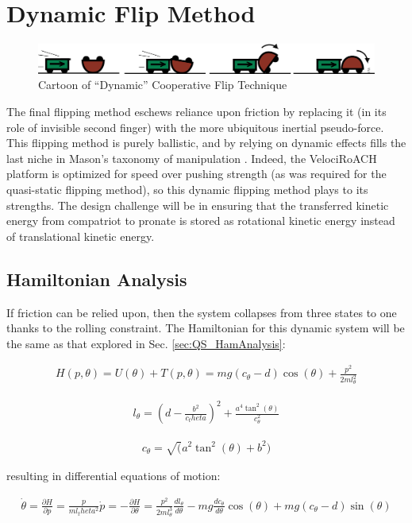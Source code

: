 \documentclass[letterpaper]{report}
\begin{document}
\chapter{Dynamic Flip Method}
\begin{figure}[ht]
\centering
\includegraphics[width=1.0\textwidth]{Dynamic_CoopCartoon.png}
\caption{Cartoon of ``Dynamic'' Cooperative Flip Technique \label{fig:DynCartoon}}
\end{figure}
The final flipping method eschews reliance upon friction by replacing it (in its role of invisible second finger) with the more ubiquitous inertial pseudo-force.
This flipping method is purely ballistic, and by relying on dynamic effects fills the last niche in Mason's taxonomy of manipulation \cite{MasonMORMBook}.
Indeed, the VelociRoACH platform is optimized for speed over pushing strength (as was required for the quasi-static flipping method), so this dynamic flipping method plays to its strengths.
The design challenge will be in ensuring that the transferred kinetic energy from compatriot to pronate is stored as rotational kinetic energy instead of translational kinetic energy.

\section{Hamiltonian Analysis}
If friction can be relied upon, then the system collapses from three states to one thanks to the rolling constraint.
The Hamiltonian for this dynamic system will be the same as that explored in Sec. \ref{sec:QS_HamAnalysis}:

\begin{align}
  H(p,\theta) = U(\theta) + T(p,\theta) = mg(c_\theta - d) \cos(\theta) + \frac{p^2}{2ml_\theta^2}
\end{align}

\begin{align}
  l_\theta = \left(d - \frac{b^2}{c_theta}\right)^2 + \frac{a^4 \tan^2(\theta)}{c_\theta^2}
\end{align}

\begin{align}
  c_\theta = \sqrt(a^2 \tan^2(\theta) + b^2)
\end{align}

resulting in differential equations of motion:

\begin{align}
  \dot{\theta} =  \frac{\partial H}{\partial p} = \frac{p}{ml_theta^2}
  \dot{p} = - \frac{\partial H}{\partial \theta} = \frac{p^2}{2 m l_\theta^3} \frac{dl_\theta}{d\theta} - mg \frac{dc_\theta}{d\theta} \cos(\theta) + mg (c_\theta - d) \sin(\theta)
\end{align}
\end{document}
